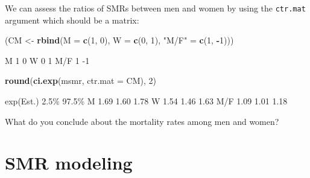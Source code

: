 \documentclass[
]{book}
\newenvironment{Shaded}{\begin{snugshade}}{\end{snugshade}}
\newcommand{\AttributeTok}[1]{\textcolor[rgb]{0.13,0.29,0.53}{#1}}
\newcommand{\DecValTok}[1]{\textcolor[rgb]{0.00,0.00,0.81}{#1}}
\newcommand{\FunctionTok}[1]{\textcolor[rgb]{0.13,0.29,0.53}{\textbf{#1}}}
\newcommand{\NormalTok}[1]{#1}
\newcommand{\OtherTok}[1]{\textcolor[rgb]{0.56,0.35,0.01}{#1}}
\newcommand{\SpecialCharTok}[1]{\textcolor[rgb]{0.81,0.36,0.00}{\textbf{#1}}}
\newcommand{\StringTok}[1]{\textcolor[rgb]{0.31,0.60,0.02}{#1}}
\begin{document}
\begin{enumerate}
  We can assess the ratios of SMRs between men and women by using the
  \texttt{ctr.mat} argument which should be a matrix:

\begin{Shaded}
\begin{Highlighting}[]
\NormalTok{(CM }\OtherTok{\textless{}{-}} \FunctionTok{rbind}\NormalTok{(}\AttributeTok{M =} \FunctionTok{c}\NormalTok{(}\DecValTok{1}\NormalTok{, }\DecValTok{0}\NormalTok{),}
             \AttributeTok{W =} \FunctionTok{c}\NormalTok{(}\DecValTok{0}\NormalTok{, }\DecValTok{1}\NormalTok{),}
         \StringTok{"M/F"} \OtherTok{=} \FunctionTok{c}\NormalTok{(}\DecValTok{1}\NormalTok{, }\SpecialCharTok{{-}}\DecValTok{1}\NormalTok{)))}
\end{Highlighting}
\end{Shaded}

\begin{Shaded}
\begin{Highlighting}[]
\NormalTok{    [,1] [,2]}
\NormalTok{M      1    0}
\NormalTok{W      0    1}
\NormalTok{M/F    1   {-}1}
\end{Highlighting}
\end{Shaded}

\begin{Shaded}
\begin{Highlighting}[]
\FunctionTok{round}\NormalTok{(}\FunctionTok{ci.exp}\NormalTok{(msmr, }\AttributeTok{ctr.mat =}\NormalTok{ CM), }\DecValTok{2}\NormalTok{)}
\end{Highlighting}
\end{Shaded}

\begin{Shaded}
\begin{Highlighting}[]
\NormalTok{    exp(Est.) 2.5\% 97.5\%}
\NormalTok{M        1.69 1.60  1.78}
\NormalTok{W        1.54 1.46  1.63}
\NormalTok{M/F      1.09 1.01  1.18}
\end{Highlighting}
\end{Shaded}

  What do you conclude about the mortality rates among men and women?
\end{enumerate}

\section{SMR modeling}\label{smr-modeling}
\end{document}
